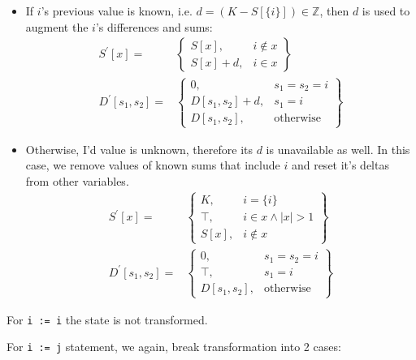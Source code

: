 \begin{itemize}
\item If $i$'s previous value is known, i.e. $d = (K - S[\{i\}]) \in \mathbb{Z}$, then $d$ is used to augment the $i$'s differences and sums:
\begin{align*}
S^\prime[x] = & \left.
	\begin{cases}
		S[x], & i \notin x \\
		S[x] + d, & i \in x
	\end{cases}
\right\}\\
D^\prime[s_1, s_2] = & \left.
	\begin{cases}
		0, & s_1 = s_2 = i \\
		D[s_1,s_2] + d, & s_1 = i \\
		D[s_1,s_2], & \text{otherwise}
	\end{cases}
\right\}
\end{align*}
\item Otherwise, I'd value is unknown, therefore its $d$ is unavailable as well. In this case, we remove values of known sums that include $i$ and reset it's deltas from other variables.
\begin{align*}
S^\prime[x] = & \left.
	\begin{cases}
	    K, & i = \{i\} \\
   		\top, & i \in x \wedge |x| > 1 \\
		S[x], & i \notin x 
	\end{cases}
\right\}\\
D^\prime[s_1, s_2] = & \left.
	\begin{cases}
		0, & s_1 = s_2 = i \\
		\top, & s_1 = i \\
		D[s_1,s_2], & \text{otherwise}
	\end{cases}
\right\}
\end{align*}
\end{itemize}

For \texttt{i := i} the state is not transformed.

For \texttt{i := j} statement, we again, break transformation into 2 cases:

